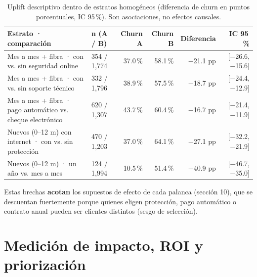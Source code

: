 \documentclass[10.5pt,a4paper]{article}
\begin{document}
\begin{table}[H]
\centering\footnotesize
\caption{Uplift descriptivo dentro de estratos homogéneos (diferencia de churn en puntos porcentuales, IC 95\,\%). Son asociaciones, no efectos causales.}
\begin{tabularx}{\textwidth}{@{}Xlrrrr@{}}
\toprule
Estrato · comparación & n (A / B) & Churn A & Churn B & Diferencia & IC 95\,\% \\
\midrule
Mes a mes + fibra · con vs. sin seguridad online & 354 / 1,774 & 37.0\,\% & 58.1\,\% & −21.1 pp & [−26.6, −15.6] \\
Mes a mes + fibra · con vs. sin soporte técnico & 332 / 1,796 & 38.9\,\% & 57.5\,\% & −18.7 pp & [−24.4, −12.9] \\
Mes a mes + fibra · pago automático vs. cheque electrónico & 620 / 1,307 & 43.7\,\% & 60.4\,\% & −16.7 pp & [−21.4, −11.9] \\
Nuevos (0–12 m) con internet · con vs. sin protección & 470 / 1,203 & 37.0\,\% & 64.1\,\% & −27.1 pp & [−32.2, −21.9] \\
Nuevos (0–12 m) · un año vs. mes a mes & 124 / 1,994 & 10.5\,\% & 51.4\,\% & −40.9 pp & [−46.7, −35.0] \\
\bottomrule
\end{tabularx}
\end{table}
Estas brechas \textbf{acotan} los supuestos de efecto de cada palanca (sección 10), que se descuentan fuertemente porque quienes eligen protección, pago automático o contrato anual pueden ser clientes distintos (sesgo de selección).

\section{Medición de impacto, ROI y priorización}
\end{document}
